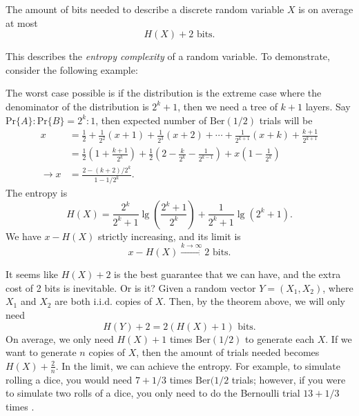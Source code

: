 \begin{theorem}
    The amount of bits needed to describe a discrete random variable $X$ is on average at most
    \begin{equation}
        H(X) + 2 \text{ bits}.
    \end{equation}
\end{theorem}
This describes the \textit{entropy complexity} of a random variable. To demonstrate, consider the following example:
\begin{example}
    The worst case possible is if the distribution is the extreme case where the denominator of the distribution is $2^{k}+1$, then we need a tree of $k+1$ layers. Say $\mathrm{Pr}\{A\}:\mathrm{Pr}\{B\} = 2^k:1$, then expected number of $\mathrm{Ber}(1/2)$ trials will be
    \begin{align*}
        x &= \frac{1}{2} + \frac{1}{2^2}(x+1)+\frac{1}{2^3}(x+2)+\cdots+\frac{1}{2^{k+1}}(x+k)+\frac{k+1}{2^{k+1}} \\
        &= \frac{1}{2}\left(1+\frac{k+1}{2^k}\right) + \frac{1}{2}\left(2-\frac{k}{2^k} - \frac{1}{2^{k-1}}\right) + x\left(1-\frac{1}{2^{k}}\right) \\
        \rightarrow x &= \frac{2-(k+2)/2^k}{1-1/2^k}.
    \end{align*}
    The entropy is
    \begin{equation*}
        H(X) = \frac{2^k}{2^k+1}\lg\left(\frac{2^k+1}{2^k}\right) + \frac{1}{2^k+1}\lg(2^k+1).
    \end{equation*}
    We have $x-H(X)$ strictly increasing, and its limit is
    \begin{equation}
        x - H(X) \xrightarrow{k\rightarrow\infty} 2 \text{ bits}. 
    \end{equation}
\end{example}

It seems like $H(X)+2$ is the best guarantee that we can have, and the extra cost of 2 bits is inevitable. Or is it? Given a random vector $Y = (X_1,X_2)$, where $X_1$ and $X_2$ are both i.i.d. copies of $X$. Then, by the theorem above, we will only need
\begin{equation*}
    H(Y) + 2 = 2\left(H(X)+1\right) \text{ bits}.
\end{equation*}
On average, we only need $H(X)+1$ times $\mathrm{Ber}(1/2)$ to generate each $X$. If we want to generate $n$ copies of $X$, then the amount of trials needed becomes $H(X)+\frac{2}{n}$. In the limit, we can achieve the entropy. For example, to simulate rolling a dice, you would need $7+1/3$ times $\mathrm{Ber}(1/2$ trials; however, if you were to simulate two rolls of a dice, you only need to do the Bernoulli trial $13 + 1/3$ times \cite{Complexity_Nonunif_Rand}.

